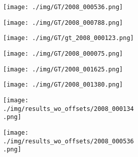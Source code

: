 \documentclass[10pt,twocolumn,letterpaper]{article}
\begin{document}
\begin{figure}[t]
\begin{subfigure}[t]{0.11\textwidth}
        \begin{subfigure}[t]{\textwidth}
                \texttt{[image: ./img/GT/2008\_000536.png]}
            \end{subfigure}\vspace{.1ex}

        \begin{subfigure}[t]{\textwidth}
                \texttt{[image: ./img/GT/2008\_000788.png]}
            \end{subfigure}\vspace{.1ex}

 \begin{subfigure}[t]{\textwidth}
                \texttt{[image: ./img/GT/gt\_2008\_000123.png]}
            \end{subfigure}\vspace{.1ex}

\begin{subfigure}[t]{\textwidth}
                \texttt{[image: ./img/GT/2008\_000075.png]}
            \end{subfigure}\vspace{.1ex}

\begin{subfigure}[t]{\textwidth}
                \texttt{[image: ./img/GT/2008\_001625.png]}
            \end{subfigure}\vspace{.1ex}

            \begin{subfigure}[t]{\textwidth}
                \texttt{[image: ./img/GT/2008\_001380.png]}
     \captionsetup{justification=centering}       
            \end{subfigure}
    \end{subfigure}
\begin{subfigure}[t]{0.11\textwidth}
        \begin{subfigure}[t]{\textwidth}
                \texttt{[image: ./img/results\_wo\_offsets/2008\_000134.png]}
            \end{subfigure}\vspace{.1ex}

        \begin{subfigure}[t]{\textwidth}
                \texttt{[image: ./img/results\_wo\_offsets/2008\_000536.png]}
            \end{subfigure}\vspace{.1ex}


\end{subfigure}
\end{figure}
\end{document}
